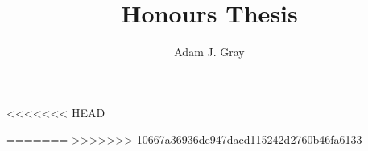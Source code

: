 \documentclass{unswmaths}
\author{Adam J. Gray}
\title{Honours Thesis}
\begin{document}
\unswtitle

\setlength\parindent{0pt}
\setlength{\parskip}{5mm plus4mm minus3mm}



\begin{abstract}
    
\end{abstract}
\clearpage
<<<<<<< HEAD

=======
>>>>>>> 10667a36936de947dacd115242d2760b46fa6133










\end{document}
